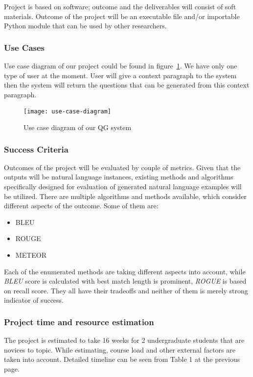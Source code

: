 \documentclass{mefsdp}
\begin{document}
	Project is based on software; outcome and the deliverables will consist of soft materials. Outcome of the project will be an executable file and/or importable Python module that can be used by other researchers.
	
	
	\subsubsection{Use Cases}
	Use case diagram of our project could be found in figure \ref{usecases}. We have only one type of user at the moment. User will give a context paragraph to the system then the system will return the questions that can be generated from this context paragraph.
	\begin{figure}[ht!]
		\centering
		\texttt{[image: use-case-diagram]}
		\caption{Use case diagram of our QG system\label{usecases}}
	\end{figure}
	\newpage
	
	\subsubsection{Success Criteria}
	Outcomes of the project will be evaluated by couple of metrics. Given that the outputs will be natural language instances, existing methods and algorithms specifically designed for evaluation of generated natural language examples will be utilized. There are multiple algorithms and methods available, which consider different aspects of the outcome. Some of them are:
	\begin{itemize}
		\item BLEU
		\item ROUGE
		\item METEOR\\
	\end{itemize}
	
	Each of the enumerated methods are taking different aspects into account, while \textit{BLEU} score is calculated with best match length is prominent, \textit{ROGUE} is based on recall score. They all have their tradeoffs and neither of them is merely strong indicator of success.
	
	\subsubsection{Project time and resource estimation}
	The project is estimated to take 16 weeks for 2 undergraduate students that are novices to topic. While estimating, course load and other external factors are taken into account. Detailed timeline can be seen from Table 1 at the previous page. \\
	
\end{document}
